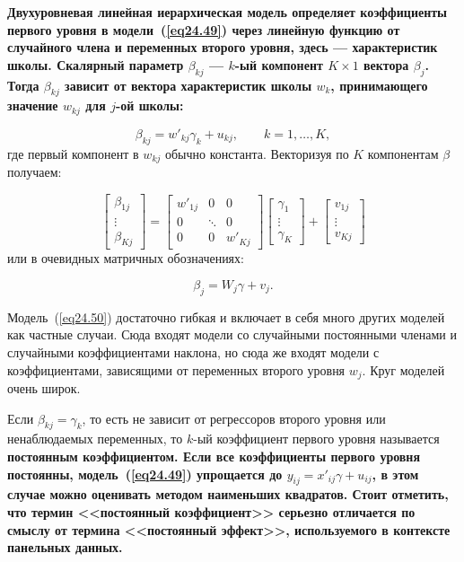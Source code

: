 \bfseries Двухуровневая линейная иерархическая модель \mdseries определяет коэффициенты первого уровня в модели~(\ref{eq24.49}) через линейную функцию от случайного члена и переменных второго уровня, здесь --- характеристик школы. Скалярный параметр $\beta_{kj}$ --- $k$-ый компонент $K \times 1$ вектора $\beta_j$. Тогда $\beta_{kj}$ зависит от вектора характеристик школы $w_k$, принимающего значение $w_{kj}$ для $j$-ой школы:

\begin{equation}
\label{eq24.50}
\beta_{kj} = w'_{kj} \gamma_k + u_{kj}, \qquad k = 1, \dots , K, 
\end{equation}
где первый компонент в $w_{kj}$ обычно константа. Векторизуя по $K$ компонентам $\beta$ получаем:

$$\begin{bmatrix}
\beta_{1j} \\ \vdots \\ \beta_{Kj}
\end{bmatrix} = \begin{bmatrix}
w'_{1j} & 0 & 0 \\ 0 & \ddots & 0 \\ 0 & 0 & w'_{Kj}
\end{bmatrix} \begin{bmatrix}
\gamma_{1} \\ \vdots \\ \gamma_{K}
\end{bmatrix} + \begin{bmatrix}
v_{1j} \\ \vdots \\ v_{Kj}
\end{bmatrix}
$$
или в очевидных матричных обозначениях:

\begin{equation}
\label{eq24.51}
\beta_{j} = W_{j} \gamma + v_j.  
\end{equation}

Модель~(\ref{eq24.50}) достаточно гибкая и включает в себя много других моделей как частные случаи. Сюда входят модели со случайными постоянными членами и случайными коэффициентами наклона, но сюда же входят модели с коэффициентами, зависящими от переменных второго уровня $w_j$. Круг моделей очень широк. 

Если $\beta_{kj} = \gamma_k$, то есть не зависит от регрессоров второго уровня или ненаблюдаемых переменных, то $k$-ый коэффициент первого уровня называется \bfseries постоянным коэффициентом. \mdseries  Если все коэффициенты первого уровня постоянны, модель~(\ref{eq24.49}) упрощается до $y_{ij} = x'_{ij} \gamma + u_{ij}$, в этом случае можно оценивать методом наименьших квадратов. Стоит отметить, что термин <<постоянный коэффициент>> серьезно отличается по смыслу от термина <<постоянный эффект>>, используемого в контексте панельных данных. 

